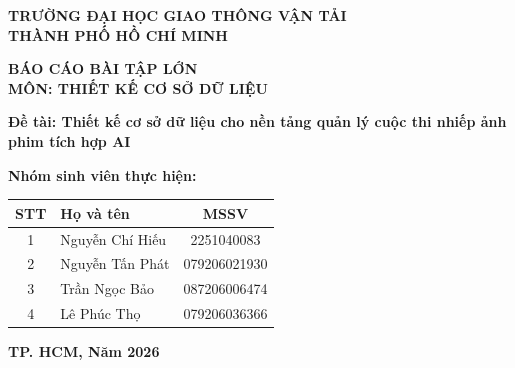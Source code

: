 \documentclass[12pt,a4paper]{report}
\begin{document}
\begin{titlepage}
    \centering
    \vspace*{1cm}

    {\fontsize{14pt}{1cm}\selectfont \textbf{TRƯỜNG ĐẠI HỌC GIAO THÔNG VẬN TẢI}} \\
    {\fontsize{14pt}{1cm}\selectfont \textbf{THÀNH PHỐ HỒ CHÍ MINH}} \\
    \vspace{1cm}

    \vspace{1cm}

    {\fontsize{20pt}{1cm}\selectfont \textbf{BÁO CÁO BÀI TẬP LỚN}} \\
    \vspace{0.5cm}
    {\fontsize{16pt}{1cm}\selectfont \textbf{MÔN: THIẾT KẾ CƠ SỞ DỮ LIỆU}} \\
    \vspace{2.5cm}

    {\fontsize{16pt}{1cm}\selectfont \textbf{Đề tài: Thiết kế cơ sở dữ liệu cho nền tảng quản lý cuộc thi nhiếp ảnh phim tích hợp AI}} \\

    \vspace{3cm}

   \begin{center}
    \large
    \textbf{Nhóm sinh viên thực hiện:}\\[0.5cm]
    \renewcommand{\arraystretch}{1.3}
    \setlength{\tabcolsep}{15pt}
    \begin{tabular}{|c|l|c|}
        \hline
        \textbf{STT} & \textbf{Họ và tên} & \textbf{MSSV} \\ \hline
        1 & Nguyễn Chí Hiếu & 2251040083 \\ \hline
        2 & Nguyễn Tấn Phát & 079206021930 \\ \hline
        3 & Trần Ngọc Bảo & 087206006474 \\ \hline
        4 & Lê Phúc Thọ & 079206036366 \\ \hline
    \end{tabular}
\end{center}

    \vfill

    {\fontsize{14pt}{1cm}\selectfont \textbf{TP. HCM, Năm 2026}}
\end{titlepage}

\tableofcontents
\newpage





\end{document}

